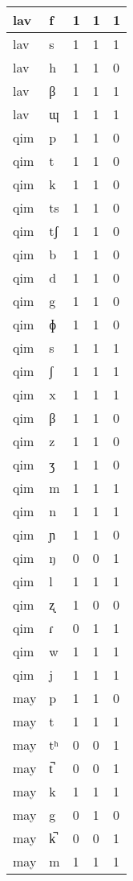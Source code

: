 \begin{longtable}{ | l | l | l | l | l | }
	lav & f & 1 & 1 & 1 \\ \hline
	lav & s & 1 & 1 & 1 \\ \hline
	lav & h & 1 & 1 & 0 \\ \hline
	lav & β & 1 & 1 & 1 \\ \hline
	lav & ɰ & 1 & 1 & 1 \\ \hline
	qim & p & 1 & 1 & 0 \\ \hline
	qim & t & 1 & 1 & 0 \\ \hline
	qim & k & 1 & 1 & 0 \\ \hline
	qim & ts & 1 & 1 & 0 \\ \hline
	qim & tʃ & 1 & 1 & 0 \\ \hline
	qim & b & 1 & 1 & 0 \\ \hline
	qim & d & 1 & 1 & 0 \\ \hline
	qim & g & 1 & 1 & 0 \\ \hline
	qim & ɸ & 1 & 1 & 0 \\ \hline
	qim & s & 1 & 1 & 1 \\ \hline
	qim & ʃ & 1 & 1 & 1 \\ \hline
	qim & x & 1 & 1 & 1 \\ \hline
	qim & β & 1 & 1 & 0 \\ \hline
	qim & z & 1 & 1 & 0 \\ \hline
	qim & ʒ & 1 & 1 & 0 \\ \hline
	qim & m & 1 & 1 & 1 \\ \hline
	qim & n & 1 & 1 & 1 \\ \hline
	qim & ɲ & 1 & 1 & 0 \\ \hline
	qim & ŋ & 0 & 0 & 1 \\ \hline
	qim & l & 1 & 1 & 1 \\ \hline
	qim & ʐ & 1 & 0 & 0 \\ \hline
	qim & ɾ & 0 & 1 & 1 \\ \hline
	qim & w & 1 & 1 & 1 \\ \hline
	qim & j & 1 & 1 & 1 \\ \hline
	may & p & 1 & 1 & 0 \\ \hline
	may & t & 1 & 1 & 1 \\ \hline
	may & tʰ & 0 & 0 & 1 \\ \hline
	may & t̚ & 0 & 0 & 1 \\ \hline
	may & k & 1 & 1 & 1 \\ \hline
	may & g & 0 & 1 & 0 \\ \hline
	may & k̚ & 0 & 0 & 1 \\ \hline
	may & m & 1 & 1 & 1 \\ \hline

\end{longtable}
